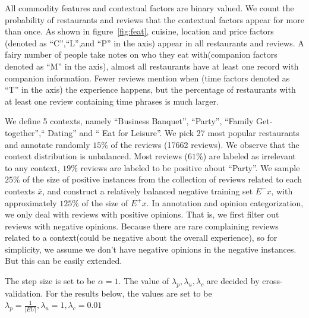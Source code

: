 \documentclass[preprint,12pt]{elsarticle}
\begin{document}
All commodity features and contextual factors are binary valued. We count the probability of restaurants and reviews that the contextual factors appear for more than once. As shown in figure~\ref{fig:feat}, cuisine, location and price factors (denoted as ``C'',``L'',and ``P'' in the axis) appear in all restaurants and reviews. A fairy number of people take notes on who they eat with(companion factors denoted as ``M'' in the axis), almost all restaurants have at least one record with companion information. Fewer reviews mention when (time factors denoted as ``T'' in the axis) the experience happens, but the percentage of restaurants with at least one review containing time phrases is much larger.

We define 5 contexts, namely ``Business Banquet'', ``Party'', ``Family Get-together'',`` Dating'' and `` Eat for Leisure''. We pick 27 most popular restaurants and annotate randomly $15\%$ of the reviews (17662 reviews). We observe that the context distribution is unbalanced. Most reviews ($61\%$) are labeled as irrelevant to any context, $19\%$ reviews are labeled to be positive about  ``Party''. We sample $25\%$ of the size of positive instances from the collection of reviews related to each contexts $\bar{x}$, and construct a relatively balanced negative training set  $E^{-}{x}$, with approximately $125\%$ of the size of $E^{+}{x}$. In annotation and opinion categorization, we only deal with reviews with positive opinions. That is, we first filter out reviews with negative opinions. Because there are rare complaining reviews related to a context(could be negative about the overall experience), so for simplicity, we assume we don't have negative opinions in the negative instances. But this can be easily extended.

The step size is set to be $\alpha=1$. The value of $\lambda_p,\lambda_u,\lambda_c$ are decided by cross-validation. For the results below, the values are set to be $\lambda_p=\frac{1}{|EU|},\lambda_u=1,\lambda_c=0.01$
\end{document}

